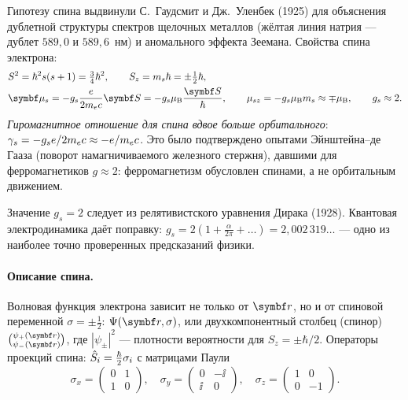 Гипотезу спина выдвинули С.~Гаудсмит и Дж.~Уленбек (1925) для объяснения дублетной структуры
спектров щелочных металлов (жёлтая линия натрия — дублет $589{,}0$ и $589{,}6$~нм) и аномального эффекта
Зеемана. Свойства спина электрона:
\begin{align}
  &S^2=\hbar^2s(s+1)=\tfrac34\hbar^2,\qquad S_z=m_s\hbar=\pm\tfrac12\hbar, \label{eq:12:S}\\
  &\vect\mu_s=-g_s\frac{e}{2\mel c}\vect S=-g_s\muB\frac{\vect S}{\hbar},\qquad \mu_{sz}=-g_s\muB m_s\approx\mp\muB,\qquad g_s\approx2 . \label{eq:12:mus}
\end{align}
\emph{Гиромагнитное отношение для спина вдвое больше орбитального}: $\gamma_s=-g_se/2m_e c\approx-e/m_e c$.
Это было подтверждено опытами Эйнштейна--де Гааза (поворот намагничиваемого железного стержня),
давшими для ферромагнетиков $g\approx2$: ферромагнетизм обусловлен спинами, а не орбитальным движением.

Значение $g_s=2$ следует из релятивистского уравнения Дирака (1928). Квантовая электродинамика даёт
поправку: $g_s=2(1+\frac{\alpha}{2\pi}+\dots)=2{,}002\,319\dots$ — одно из наиболее точно проверенных
предсказаний физики.

\paragraph{Описание спина.} Волновая функция электрона зависит не только от $\vect r$, но и от спиновой
переменной $\sigma=\pm\frac12$: $\Psi(\vect r,\sigma)$, или двухкомпонентный столбец (спинор)
$\binom{\psi_+(\vect r)}{\psi_-(\vect r)}$, где $|\psi_\pm|^2$ — плотности вероятности для $S_z=\pm\hbar/2$. Операторы
проекций спина: $\hat{S}_i=\frac\hbar2\sigma_i$ с матрицами Паули
\[
  \sigma_x=\begin{pmatrix}0&1\\1&0\end{pmatrix},\quad
  \sigma_y=\begin{pmatrix}0&-\ii\\\ii&0\end{pmatrix},\quad
  \sigma_z=\begin{pmatrix}1&0\\0&-1\end{pmatrix}.
\]

